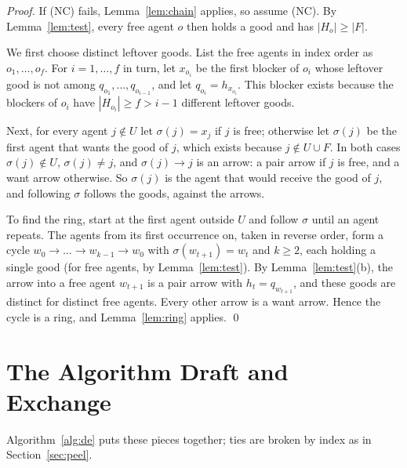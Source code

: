 \documentclass[runningheads,11pt]{llncs}
\begin{document}
\begin{proof}
If (NC) fails, Lemma~\ref{lem:chain} applies, so assume (NC). By Lemma~\ref{lem:test}, every free agent $o$ then holds a good and has $|H_o|\ge|F|$.

We first choose distinct leftover goods. List the free agents in index order as $o_1,\dots,o_f$. For $i=1,\dots,f$ in turn, let $x_{o_i}$ be the first blocker of $o_i$ whose leftover good is not among $q_{o_1},\dots,q_{o_{i-1}}$, and let $q_{o_i}=h_{x_{o_i}}$. This blocker exists because the blockers of $o_i$ have $|H_{o_i}|\ge f>i-1$ different leftover goods.

Next, for every agent $j\notin U$ let $\sigma(j)=x_j$ if $j$ is free; otherwise let $\sigma(j)$ be the first agent that wants the good of $j$, which exists because $j\notin U\cup F$. In both cases $\sigma(j)\notin U$, $\sigma(j)\ne j$, and $\sigma(j)\to j$ is an arrow: a pair arrow if $j$ is free, and a want arrow otherwise. So $\sigma(j)$ is the agent that would receive the good of $j$, and following $\sigma$ follows the goods, against the arrows.

To find the ring, start at the first agent outside $U$ and follow $\sigma$ until an agent repeats. The agents from its first occurrence on, taken in reverse order, form a cycle $w_0\to\dots\to w_{k-1}\to w_0$ with $\sigma(w_{t+1})=w_t$ and $k\ge2$, each holding a single good (for free agents, by Lemma~\ref{lem:test}). By Lemma~\ref{lem:test}(b), the arrow into a free agent $w_{t+1}$ is a pair arrow with $h_t=q_{w_{t+1}}$, and these goods are distinct for distinct free agents. Every other arrow is a want arrow. Hence the cycle is a ring, and Lemma~\ref{lem:ring} applies. \qed
\end{proof}

\section{The Algorithm Draft and Exchange}\label{sec:algo}

Algorithm~\ref{alg:de} puts these pieces together; ties are broken by index as in Section~\ref{sec:peel}.
\end{document}

